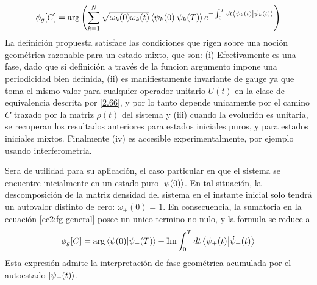 \begin{equation}
    \phi_g[C]=\arg \left( \sum_{k=1}^{N} \sqrt{\omega_k(0)\omega_k(t)} \braket{\psi_k(0)}{\psi_k(T)}e^{-\int_{0}^{T}dt\braket{\psi_k(t)}{\dot\psi_k(t)}} \right)
\end{equation}\label{ec2:fg general}
La definición propuesta satisface las condiciones que rigen sobre una noción geométrica razonable para un estado mixto, que son: (i) Efectivamente es una fase, dado que si definición a través de la funcion argumento impone una periodicidad bien definida, (ii) es manifiestamente invariante de gauge ya que toma el mismo valor para cualquier operador unitario $U(t)$ en la clase de equivalencia descrita por \ref{2.66}, y por lo tanto depende unicamente por el camino $C$ trazado por la matriz $\rho(t)$ del sistema y (iii) cuando la evolución es unitaria, se recuperan los resultados anteriores para estados iniciales puros, y \cite{9-10} para estados iniciales mixtos. Finalmente (iv) es accesible experimentalmente, por ejemplo usando interferometria.

Sera de utilidad para su aplicación, el caso particular en que el sistema se encuentre inicialmente en un estado puro $\ket{\psi(0)}$. En tal situación, la descomposición de la matriz densidad del sistema en el instante inicial solo tendrá un autovalor distinto de cero: $\omega_+(0)=1$. En consecuencia, la sumatoria en la ecuación \ref{ec2:fg general} posee un unico termino no nulo, y la formula se reduce a 
\begin{equation}
    \phi_g[C]=\arg{\braket{\psi(0)}{\psi_+(T)}}-\Im \int_{0}^{T}dt \braket{\psi_+(t)}{\dot\psi_+(t)}
\end{equation}\label{ec2:fg general puro}
Esta expresión admite la interpretación de fase geométrica acumulada por el autoestado $\ket{\psi_+(t)}$.

